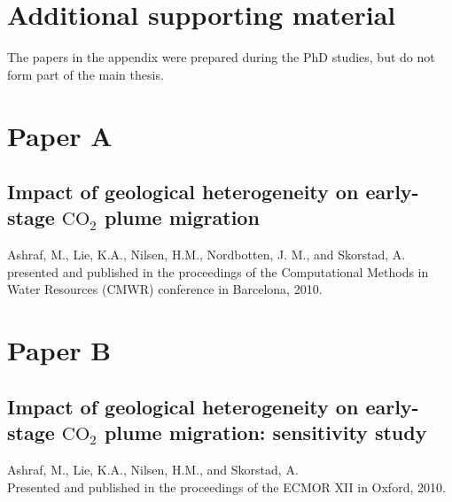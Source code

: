 \chapter{Additional supporting material}
\label{appendixA}
\pagebreak
The papers in the appendix were prepared during the PhD studies, but do not form part of the main thesis.

\pagebreak

\chapter*{Paper A}
\label{paperA}

\section{Impact of geological heterogeneity on early-stage $\mbox{CO}_2$ plume
migration}

\noindent Ashraf, M., Lie, K.A., Nilsen, H.M., Nordbotten, J. M., and
Skorstad, A.\\

\noindent presented and published in the proceedings of the Computational Methods in Water Resources
(CMWR) conference in Barcelona, 2010.
\cleardoublepage



\pagebreak

\chapter*{Paper B}
\label{paperB}

\section{Impact of geological heterogeneity on early-stage $\mbox{CO}_2$ plume
migration: sensitivity study}

\noindent Ashraf, M., Lie, K.A., Nilsen, H.M., and
Skorstad, A.\\

\noindent Presented and published in the proceedings of the ECMOR XII in Oxford, 2010.
\cleardoublepage



